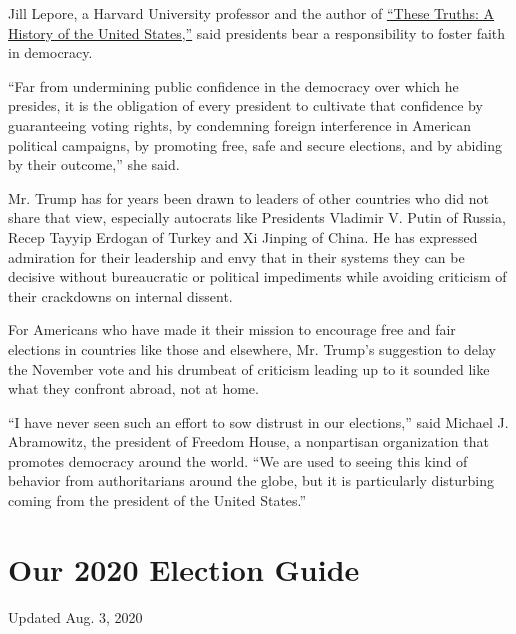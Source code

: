 Jill Lepore, a Harvard University professor and the author of
\href{https://www.nytimes.com/2018/09/14/books/review/jill-lepore-these-truths.html}{``These
Truths: A History of the United States,''} said presidents bear a
responsibility to foster faith in democracy.

``Far from undermining public confidence in the democracy over which he
presides, it is the obligation of every president to cultivate that
confidence by guaranteeing voting rights, by condemning foreign
interference in American political campaigns, by promoting free, safe
and secure elections, and by abiding by their outcome,'' she said.

Mr. Trump has for years been drawn to leaders of other countries who did
not share that view, especially autocrats like Presidents Vladimir V.
Putin of Russia, Recep Tayyip Erdogan of Turkey and Xi Jinping of China.
He has expressed admiration for their leadership and envy that in their
systems they can be decisive without bureaucratic or political
impediments while avoiding criticism of their crackdowns on internal
dissent.

For Americans who have made it their mission to encourage free and fair
elections in countries like those and elsewhere, Mr. Trump's suggestion
to delay the November vote and his drumbeat of criticism leading up to
it sounded like what they confront abroad, not at home.

``I have never seen such an effort to sow distrust in our elections,''
said Michael J. Abramowitz, the president of Freedom House, a
nonpartisan organization that promotes democracy around the world. ``We
are used to seeing this kind of behavior from authoritarians around the
globe, but it is particularly disturbing coming from the president of
the United States.''

\hypertarget{our-2020-election-guide}{%
\section{Our 2020 Election Guide}\label{our-2020-election-guide}}

Updated Aug. 3, 2020

